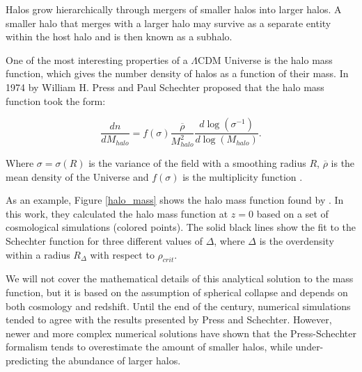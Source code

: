 Halos grow hierarchically through mergers of smaller halos into larger halos. A smaller halo that merges with a larger halo may survive as a separate entity within the host halo and is then known as a subhalo. 

One of the most interesting properties of a $\Lambda$CDM Universe is the halo mass function, which gives the number density of halos as a function of their mass. In 1974  by William H. Press and Paul Schechter proposed that the halo mass function took the form:

\begin{equation}
    \frac{dn}{dM_{halo}} = f(\sigma)\frac{\overline{\rho}}{M_{halo}^2}\frac{d\log(\sigma^{-1})}{d\log(M_{halo})}.
\end{equation}

Where $\sigma = \sigma (R)$ is the variance of the field with a smoothing radius $R$, $\overline{\rho}$ is the mean density of the Universe and $f(\sigma)$ is the multiplicity function \parencite{Press1974}. 

As an example, Figure \ref{halo_mass} shows the halo mass function found by \textcite{Tinker2008}. In this work, they calculated the halo mass function at $z=0$ based on a set of cosmological simulations (colored points). The solid black lines show the fit to the Schechter function for three different values of $\Delta$, where $\Delta$ is the overdensity within a radius $R_{\Delta}$ with respect to $\rho_{crit}$.

We will not cover the mathematical details of this analytical solution to the mass function, but it is based on the assumption of spherical collapse and depends on both cosmology and redshift.
Until the end of the century, numerical simulations tended to agree with the results presented by Press and Schechter. However, newer and more complex numerical solutions have shown that the Press-Schechter formalism tends to overestimate the amount of smaller halos, while under-predicting the abundance of larger halos.


